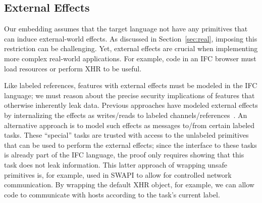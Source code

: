 \subsection{External Effects}
\label{sec:extensions:external}
Our embedding assumes that the target language not have any
primitives that can induce external-world effects.
%
As discussed in Section~\ref{sec:real}, imposing this restriction
can be challenging.
%
Yet, external effects are crucial when implementing more complex
real-world applications.
%
For example, code in an IFC browser must load resources or
perform XHR to be useful.

Like labeled references, features with external effects must be
modeled in the IFC language; we must reason about the precise security
implications of features that otherwise inherently leak data.
%
Previous approaches have modeled external effects by internalizing the
effects as writes/reads to labeled channels/references~\cite{stefan:addressing-covert}.
%
An alternative approach is to model such effects as messages to/from
certain labeled tasks.
%
These ``special'' tasks are trusted with access to the unlabeled
primitives that can be used to perform the external effects; since the
interface to these tasks is already part of the IFC language, the
proof only requires showing that this task does not leak information.
%
This latter approach of wrapping unsafe primitives is, for example,
used in SWAPI to allow for controlled network communication.
%
By wrapping the default XHR object, for example, we can allow code
to communicate with hosts according to the task's current label.
